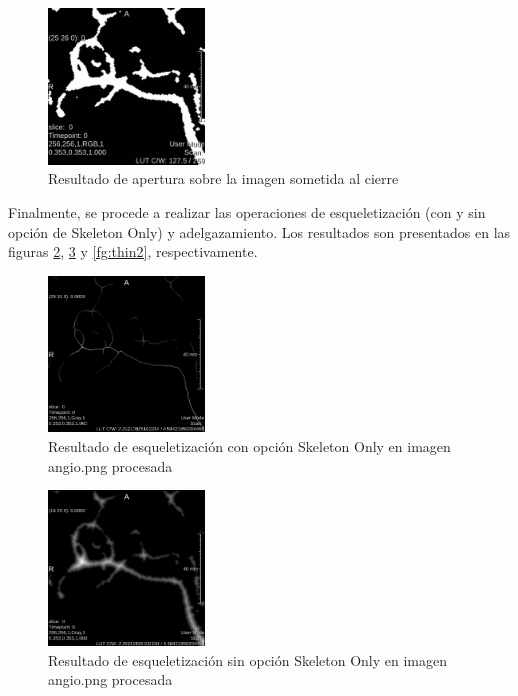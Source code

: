 \documentclass{article}
\begin{document}
\begin{figure}[ht]
\begin{center}
\includegraphics[width=0.37\textwidth]{3Esqueleto/3_apertura2} %
\caption{Resultado de apertura sobre la imagen sometida al cierre}
\label{fg:apertura2}
\end{center}
\end{figure}
\FloatBarrier

Finalmente, se procede a realizar las operaciones de esqueletizaci\'{o}n (con y sin opci\'{o}n de Skeleton Only) y adelgazamiento. Los resultados son presentados en las figuras \ref{fg:esqueleto2}, \ref{fg:notonly2} y \ref{fg:thin2}, respectivamente.

\begin{figure}[ht]
\begin{center}
\includegraphics[width=0.37\textwidth]{3Esqueleto/3_skelet2} %
\caption{Resultado de esqueletizaci\'{o}n con opci\'{o}n Skeleton Only en imagen angio.png procesada}
\label{fg:esqueleto2}
\end{center}
\end{figure}
\FloatBarrier

\begin{figure}[ht]
\begin{center}
\includegraphics[width=0.37\textwidth]{3Esqueleto/3_skelet_notonly2} %
\caption{Resultado de esqueletizaci\'{o}n sin opci\'{o}n Skeleton Only en imagen angio.png procesada}
\label{fg:notonly2}
\end{center}
\end{figure}
\FloatBarrier
\end{document}
